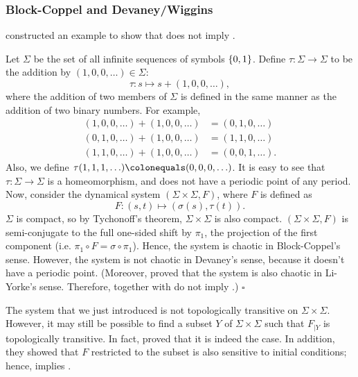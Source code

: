 \documentclass[10pt,twoside,draft]{book}
\begin{document}
\subsubsection*{Block-Coppel and Devaney/Wiggins}
\citet{aulbach} constructed an example to show that \blcp does not imply \dev.
\begin{example}
  \citep{aulbach} 
  Let $\Sigma$ be the set of all infinite sequences of symbols $\left \{ 0,1 \right \}$.
  Define $\tau: \Sigma \to \Sigma$ to be the addition by $(1, 0, 0, \ldots) \in \Sigma$:
  \begin{equation*}
    \tau: s \mapsto s + (1, 0, 0, \ldots),
  \end{equation*}
  where the addition of two members of $\Sigma$ is defined in the same manner as the addition of two binary numbers.
  For example, 
  \begin{align*}
    (1, 0, 0, \ldots) + (1, 0, 0, \ldots) &= (0, 1, 0, \ldots) \\
    (0, 1, 0, \ldots) + (1, 0, 0, \ldots) &= (1, 1, 0, \ldots) \\
    (1, 1, 0, \ldots) + (1, 0, 0, \ldots) &= (0, 0, 1, \ldots).
  \end{align*}
  Also, we define $\tau(1,1,1, \ldots) \ceq (0,0,0, \ldots)$.
  It is easy to see that $\tau: \Sigma \to \Sigma$ is a homeomorphism, and does not have a periodic point of any period.
  Now, consider the dynamical system $(\Sigma \times \Sigma, F)$, where $F$ is defined as
  \begin{equation*}
    F: (s, t) \mapsto (\sigma(s), \tau(t)).
  \end{equation*}
  $\Sigma$ is compact, so by Tychonoff's theorem, $\Sigma \times \Sigma$ is also compact.
  $(\Sigma \times \Sigma, F)$ is semi-conjugate to the full one-sided shift by $\pi_1$, the projection of the first component (i.e. $\pi_1 \circ F = \sigma \circ \pi_1$).
  Hence, the system is chaotic in Block-Coppel's sense.
  However, the system is not chaotic in Devaney's sense, because it doesn't have a periodic point.
  (Moreover, \citet{blockcoppel} proved that the system is also chaotic in Li-Yorke's sense.
  Therefore, \blcp together with \liy do not imply \dev.)
  $\square$
\end{example}
The system that we just introduced is not topologically transitive on $\Sigma \times \Sigma$.
However, it may still be possible to find a subset $Y$ of $\Sigma \times \Sigma$ such that $F_{|Y}$ is topologically transitive.
In fact, \citet{auslander} proved that it is indeed the case.
In addition, they showed that $F$ restricted to the subset is also sensitive to initial conditions; hence, \blcp implies \wig.
\end{document}
